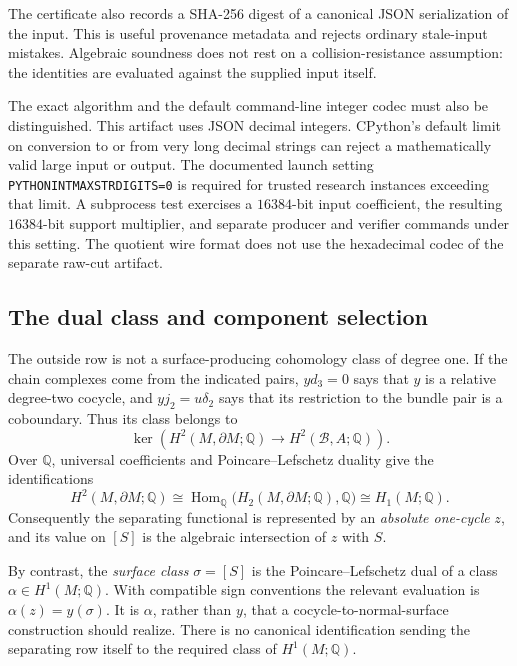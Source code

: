 The certificate also records a SHA-256 digest of a canonical JSON
serialization of the input. This is useful provenance metadata and
rejects ordinary stale-input mistakes. Algebraic soundness does not
rest on a collision-resistance assumption: the identities are
evaluated against the supplied input itself.

The exact algorithm and the default command-line integer codec must
also be distinguished. This artifact uses JSON decimal integers.
CPython's default limit on conversion to or from very long decimal
strings can reject a mathematically valid large input or output.
The documented launch setting
\texttt{PYTHONINTMAXSTRDIGITS=0} is required for trusted research
instances exceeding that limit. A subprocess test exercises a
$16384$-bit input coefficient, the resulting $16384$-bit support
multiplier, and separate producer and verifier commands under this
setting. The quotient wire format does not use the hexadecimal
codec of the separate raw-cut artifact.

\subsection{The dual class and component selection}

The outside row is not a surface-producing cohomology class of
degree one. If the chain complexes come from the indicated pairs,
$yd_3=0$ says that $y$ is a relative degree-two cocycle, and
$yj_2=u\delta_2$ says that its restriction to the bundle pair is a
coboundary. Thus its class belongs to
\begin{equation}
 \label{eq:quotient-cohomological-annihilator}
 \ker\!\left(
 H^2(M,\partial M;\mathbb Q)
 \longrightarrow H^2(\mathcal B,A;\mathbb Q)
 \right).
\end{equation}
Over $\mathbb Q$, universal coefficients and Poincare--Lefschetz
duality give the identifications
\[
 H^2(M,\partial M;\mathbb Q)
 \cong\operatorname{Hom}_{\mathbb Q}
       \bigl(H_2(M,\partial M;\mathbb Q),\mathbb Q\bigr)
 \cong H_1(M;\mathbb Q).
\]
Consequently the separating functional is represented by an
\emph{absolute one-cycle} $z$, and its value on $[S]$ is the
algebraic intersection of $z$ with $S$.

By contrast, the \emph{surface class} $\sigma=[S]$ is the
Poincare--Lefschetz dual of a class
$\alpha\in H^1(M;\mathbb Q)$.
With compatible sign conventions the relevant evaluation is
$\alpha(z)=y(\sigma)$. It is $\alpha$, rather than $y$, that a
cocycle-to-normal-surface construction should realize. There is
no canonical identification sending the separating row itself
to the required class of $H^1(M;\mathbb Q)$.

